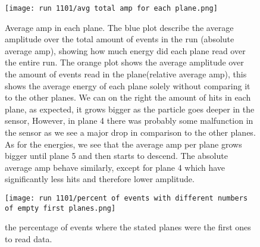 \documentclass[11pt]{article}
\begin{document}
\begin{figure}[h!]
    \centering  \texttt{[image: run 1101/avg total amp for each plane.png]}
    \caption{Average amp in each plane. The blue plot describe the average amplitude over the total amount of events in the run (absolute average amp), showing how much energy did each plane read over the entire run. The orange plot shows the average amplitude over the amount of events read in the plane(relative average amp), this shows the average energy of each plane solely without comparing it to the other planes. We can on the right the amount of hits in each plane, as expected, it grows bigger as the particle goes deeper in the sensor, However, in plane 4 there was probably some malfunction in the sensor as we see a major drop in comparison to the other planes. As for the energies, we see that the average amp per plane grows bigger until plane 5 and then starts to descend. The absolute average amp behave similarly, except for plane 4 which have significantly less hits and therefore lower amplitude.}
    \label{avg amp per plane run 1101}
\end{figure}




\begin{figure}[h!]
    \centering  \texttt{[image: run 1101/percent of events with different numbers of empty first planes.png]}
    \caption{the percentage of events where the stated planes were the first ones to read data.}
    \label{empty first planes run 1101}
\end{figure}
\\
\end{document}
